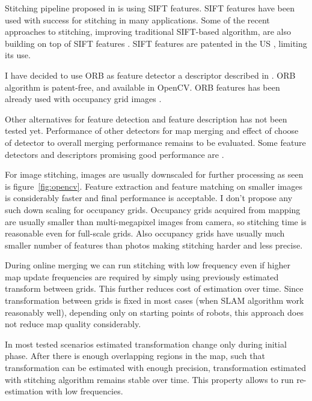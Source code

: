 Stitching pipeline proposed in \cite{Brown2006} is using \gls{SIFT} features. \gls{SIFT} features have been used with success for stitching in many applications. Some of the recent approaches to stitching, improving traditional \gls{SIFT}-based algorithm, are also building on top of \gls{SIFT} features \cite{Xie2015}. \gls{SIFT} features are patented in the US \cite{lowe2004method}, limiting its use.

I have decided to use \gls{ORB} as feature detector a descriptor described in \cite{Rublee2011}. \gls{ORB} algorithm is patent-free, and available in \gls{OpenCV}. \gls{ORB} features has been already used with occupancy grid images \cite{MapstitchROS} \cite{Andre2014}.

Other alternatives for feature detection and feature description has not been tested yet. Performance of other detectors for map merging and effect of choose of detector to overall merging performance remains to be evaluated. Some feature detectors and descriptors promising good performance are \cite{Alahi2012} \cite{alcantarilla2011fast} \cite{calonder2010brief}.

For image stitching, images are usually downscaled for further processing as seen is figure~\ref{fig:opencv}. Feature extraction and feature matching on smaller images is considerably faster and final performance is acceptable. I don't propose any such down scaling for occupancy grids. Occupancy grids acquired from mapping are usually smaller than multi-megapixel images from camera, so stitching time is reasonable even for full-scale grids. Also occupancy grids have usually much smaller number of features than photos making stitching harder and less precise.

During online merging we can run stitching with low frequency even if higher map update frequencies are required by simply using previously estimated transform between grids. This further reduces cost of estimation over time. Since transformation between grids is fixed in most cases (when \gls{SLAM} algorithm work reasonably well), depending only on starting points of robots, this approach does not reduce map quality considerably.

In most tested scenarios estimated transformation change only during initial phase. After there is enough overlapping regions in the map, such that transformation can be estimated with enough precision, transformation estimated with stitching algorithm remains stable over time. This property allows to run re-estimation with low frequencies.

